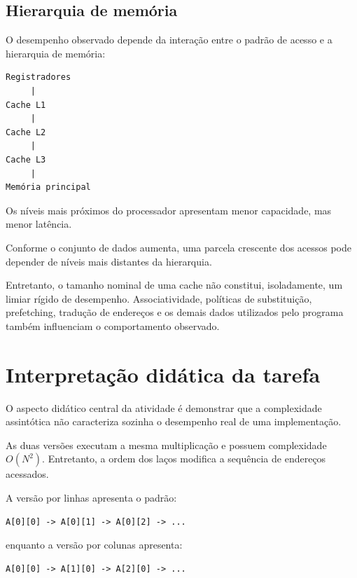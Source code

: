 \subsection{Hierarquia de memória}

O desempenho observado depende da interação entre o padrão de acesso e
a hierarquia de memória:

\begin{verbatim}
Registradores
     |
Cache L1
     |
Cache L2
     |
Cache L3
     |
Memória principal
\end{verbatim}

Os níveis mais próximos do processador apresentam menor capacidade, mas
menor latência.

Conforme o conjunto de dados aumenta, uma parcela crescente dos acessos
pode depender de níveis mais distantes da hierarquia.

Entretanto, o tamanho nominal de uma cache não constitui, isoladamente,
um limiar rígido de desempenho. Associatividade, políticas de
substituição, prefetching, tradução de endereços e os demais dados
utilizados pelo programa também influenciam o comportamento observado.



\section{Interpretação didática da tarefa}

\label{sec:atvd01-interpretacao}

O aspecto didático central da atividade é demonstrar que a complexidade
assintótica não caracteriza sozinha o desempenho real de uma
implementação.

As duas versões executam a mesma multiplicação e possuem complexidade
\(O(N^2)\). Entretanto, a ordem dos laços modifica a sequência de
endereços acessados.

A versão por linhas apresenta o padrão:

\begin{verbatim}
A[0][0] -> A[0][1] -> A[0][2] -> ...
\end{verbatim}

enquanto a versão por colunas apresenta:

\begin{verbatim}
A[0][0] -> A[1][0] -> A[2][0] -> ...
\end{verbatim}

